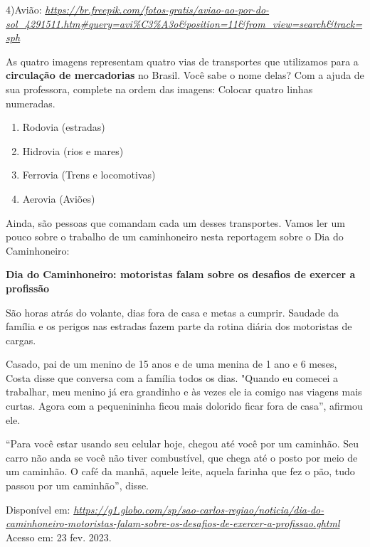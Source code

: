 4)Avião:
\href{https://br.freepik.com/fotos-gratis/aviao-ao-por-do-sol_4291511.htm\#query=avi\%C3\%A3o\&position=11\&from_view=search\&track=sph}{\emph{https://br.freepik.com/fotos-gratis/aviao-ao-por-do-sol\_4291511.htm\#query=avi\%C3\%A3o\&position=11\&from\_view=search\&track=sph}}

As quatro imagens representam quatro vias de transportes que utilizamos
para a \textbf{circulação de mercadorias} no Brasil. Você sabe o nome
delas? Com a ajuda de sua professora, complete na ordem das imagens:
Colocar quatro linhas numeradas.

\begin{enumerate}
\def\labelenumi{\arabic{enumi}.}
\item
  Rodovia (estradas)
\item
  Hidrovia (rios e mares)
\item
  Ferrovia (Trens e locomotivas)
\item
  Aerovia (Aviões)
\end{enumerate}

Ainda, são pessoas que comandam cada um desses transportes. Vamos ler um
pouco sobre o trabalho de um caminhoneiro nesta reportagem sobre o Dia
do Caminhoneiro:

\textbf{Dia do Caminhoneiro: motoristas falam sobre os desafios de
exercer a profissão}

São horas atrás do volante, dias fora de casa e metas a cumprir. Saudade
da família e os perigos nas estradas fazem parte da rotina diária dos
motoristas de cargas.

Casado, pai de um menino de 15 anos e de uma menina de 1 ano e 6 meses,
Costa disse que conversa com a família todos os dias. "Quando eu comecei
a trabalhar, meu menino já era grandinho e às vezes ele ia comigo nas
viagens mais curtas. Agora com a pequenininha ficou mais dolorido ficar
fora de casa'', afirmou ele.

``Para você estar usando seu celular hoje, chegou até você por um
caminhão. Seu carro não anda se você não tiver combustível, que chega
até o posto por meio de um caminhão. O café da manhã, aquele leite,
aquela farinha que fez o pão, tudo passou por um caminhão'', disse.

Disponível em:
\href{https://g1.globo.com/sp/sao-carlos-regiao/noticia/dia-do-caminhoneiro-motoristas-falam-sobre-os-desafios-de-exercer-a-profissao.ghtml}{\emph{https://g1.globo.com/sp/sao-carlos-regiao/noticia/dia-do-caminhoneiro-motoristas-falam-sobre-os-desafios-de-exercer-a-profissao.ghtml}}
Acesso em: 23 fev. 2023.

